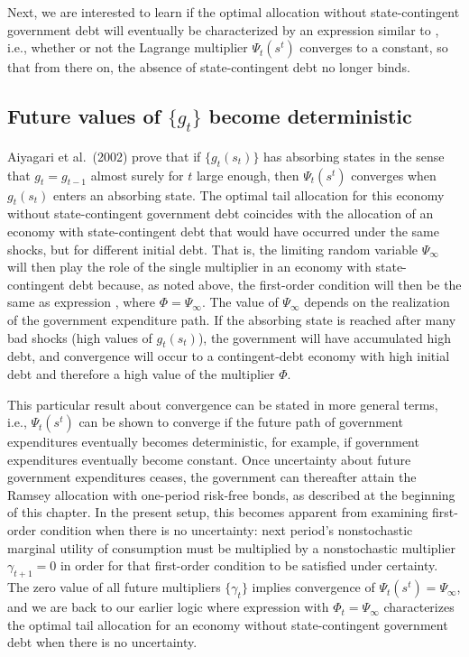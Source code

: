 Next, we are interested to learn
if the optimal allocation without state-contingent government debt
will eventually be characterized by an
expression similar to ,
i.e., whether or not the Lagrange multiplier $\Psi_t(s^t)$ converges
to a constant, so that from there on, the absence of state-contingent
debt no longer binds.


\subsection{Future values of $\{g_t\}$ become deterministic}
Aiyagari et al.\ (2002) prove that if $\{g_t(s_t)\}$ has absorbing states
in the sense that $g_t = g_{t-1}$ almost surely for $t$ large enough,
then $\Psi_t(s^t)$ converges when $g_t(s_t)$ enters an absorbing state.
The optimal tail allocation for this economy without state-contingent
government debt coincides with the allocation of an economy with
state-contingent debt that would have occurred under the same
shocks, but for different initial debt. That is, the limiting random
variable $\Psi_\infty$ will then play the role of the single multiplier
in an economy with state-contingent debt because, as noted above,
the first-order condition  will then be the same
as expression , where $\Phi=\Psi_\infty$. The value of $\Psi_\infty$
depends on the realization of the government expenditure path. If the
absorbing state is reached after many bad shocks (high values of
$g_t(s_t)$), the government will have accumulated high debt, and
convergence will occur to a contingent-debt economy with
high initial debt and therefore a high value of the multiplier
$\Phi$.

This particular result about convergence
can be stated in more general terms, i.e., $\Psi_t(s^t)$ can
be shown to converge if the future path of government expenditures
eventually  becomes deterministic, for example, if government expenditures eventually  become
 constant. Once uncertainty about future government expenditures ceases, the
government can thereafter  attain the Ramsey allocation
with one-period risk-free bonds, as described at the beginning of
this chapter. In the present setup, this becomes
apparent from examining first-order condition 
when there is no uncertainty: next period's nonstochastic
marginal utility of consumption must be multiplied
by a nonstochastic multiplier $\gamma_{t+1}=0$ in order for
that first-order condition to be satisfied under certainty.
The zero value of all future multipliers $\{\gamma_t\}$
implies convergence of $\Psi_t(s^t)=\Psi_\infty$, and we are
back to our earlier logic where expression 
with $\Phi_t=\Psi_\infty$
characterizes the optimal tail allocation for an
economy without state-contingent government debt when there
is no uncertainty.

